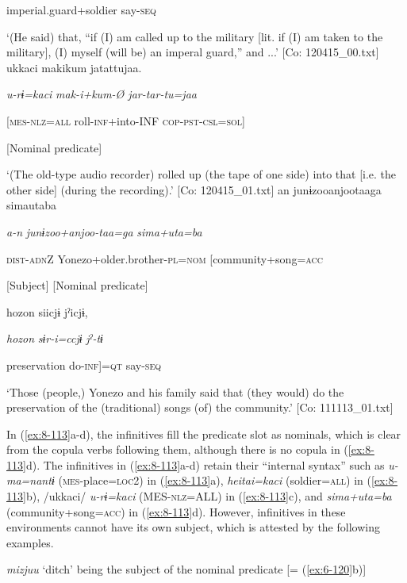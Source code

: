       imperial.guard+soldier  say-\textsc{seq}

\glt ‘(He said) that, “if (I) am called up to the military [lit. if (I) am taken to the military], (I) myself (will be) an imperal guard,” and ...’ [Co: 120415\_00.txt]
\ex {\TM}
\glll  ukkaci  makikum  jatattujaa.

      \textit{u-rɨ=kaci}  \textit{mak-i+kum{}-Ø  jar-tar-tu=jaa}

      [\textsc{mes}-\textsc{nlz}=\textsc{all}  roll-\textsc{inf}+into-INF  \textsc{cop}-\textsc{pst}-\textsc{csl}=\textsc{sol}]

      [Nominal predicate]

\glt ‘(The old-type audio recorder) rolled up (the tape of one side) into that [i.e. the other side] (during the recording).’ [Co: 120415\_01.txt]
\ex {\TM}
\glll  an  junɨzooanjootaaga  simautaba

      \textit{a-n}  \textit{junɨzoo+anjoo-taa=ga}  \textit{sima+uta=ba}

      \textsc{dist}-\textsc{adn}Z  Yonezo+older.brother-\textsc{pl}=\textsc{nom}  [community+song=\textsc{acc}

      [Subject]  [Nominal predicate]

      {\textbar}hozon{\textbar}  siicjɨ  jˀicjɨ,

      \textit{hozon}  \textit{sɨr-i=ccjɨ}  \textit{jˀ-tɨ}

      preservation  do-\textsc{inf}]=\textsc{qt}  say-\textsc{seq}

\glt ‘Those (people,) Yonezo and his family said that (they would) do the preservation of the (traditional) songs (of) the community.’ [Co: 111113\_01.txt]
\z

In (\ref{ex:8-113}a-d), the infinitives fill the predicate slot as nominals, which is clear from the copula verbs following them, although there is no copula in (\ref{ex:8-113}d). The infinitives in (\ref{ex:8-113}a-d) retain their “internal syntax” \citep{Haspelmath1996} such as \textit{u-ma=nantɨ} (\textsc{mes}-place=\textsc{loc}2) in (\ref{ex:8-113}a), \textit{heitai=kaci} (soldier=\textsc{all}) in (\ref{ex:8-113}b), /ukkaci/ \textit{u-rɨ=kaci} (MES-\textsc{nlz}=ALL) in (\ref{ex:8-113}c), and \textit{sima+uta=ba} (community+song=\textsc{acc}) in (\ref{ex:8-113}d). However, infinitives in these environments cannot have its own subject, which is attested by the following examples.

\ea\label{ex:8-114}
\ea \textit{mizjuu} ‘ditch’ being the subject of the nominal predicate [= (\ref{ex:6-120}b)]

